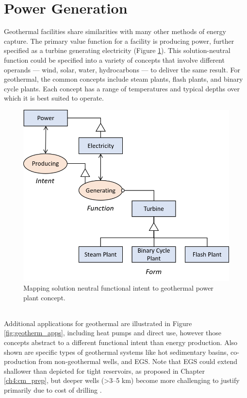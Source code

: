 \section{Power Generation}\label{ch2:power_gen}
Geothermal facilities share similarities with many other methods of energy capture. The primary value function for a facility is producing power, further specified as a turbine generating electricity (Figure \ref{fig:solution_neutral}). This solution-neutral function could be specified into a variety of concepts that involve different operands --- wind, solar, water, hydrocarbons --- to deliver the same result. For geothermal, the common concepts include steam plants, flash plants, and binary cycle plants. Each concept has a range of temperatures and typical depths over which it is best suited to operate.
\\
\begin{figure}[!htp]
\centering
\includegraphics[width=.6\linewidth]{templates/images/Figure-PowerProduction-SolutionNeutral.png}
\singlespacing
\caption[Intent to concept for geothermal power plants]{Mapping solution neutral functional intent to geothermal power plant concept.}
\label{fig:solution_neutral}
\end{figure}
\\
Additional applications for geothermal are illustrated in Figure \ref{fig:geotherm_apps}, including heat pumps and direct use, however those concepts abstract to a different functional intent than energy production. Also shown are specific types of geothermal systems like hot sedimentary basins, co-production from non-geothermal wells, and EGS. Note that EGS could extend shallower than depicted for tight reservoirs, as proposed in Chapter \ref{ch4:cm_prep}, but deeper wells (>3--5 km) become more challenging to justify primarily due to cost of drilling \citep{moore_more_2013}.

